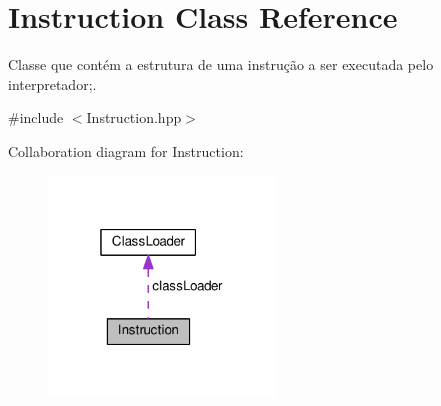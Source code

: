 \hypertarget{classInstruction}{}\section{Instruction Class Reference}
\label{classInstruction}


Classe que contém a estrutura de uma instrução a ser executada pelo interpretador;.  




{\ttfamily \#include $<$Instruction.\+hpp$>$}



Collaboration diagram for Instruction\+:\nopagebreak
\begin{figure}[H]
\begin{center}
\leavevmode
\includegraphics[width=172pt]{classInstruction__coll__graph}
\end{center}
\end{figure}

